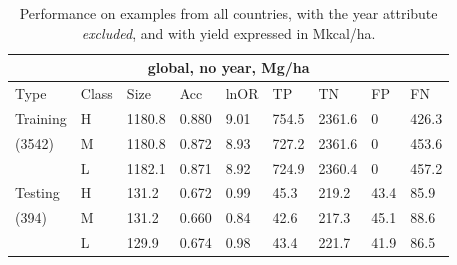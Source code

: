 \documentclass[12pt]{article}
\begin{document}
\begin{table}[h!]
\centering
\begin{tabular}{lllllllll}
\toprule
\multicolumn{9}{c}{\textbf{global, no year, Mg/ha}} \\
\midrule
Type & Class & Size & Acc & lnOR & TP & TN & FP & FN \\
\midrule
Training & H & 1180.8 & 0.880 & 9.01 & 754.5 & 2361.6 & 0 & 426.3  \\
(3542) & M & 1180.8 & 0.872 & 8.93 & 727.2 & 2361.6 & 0 & 453.6  \\
& L & 1182.1 & 0.871 & 8.92 & 724.9 & 2360.4 & 0 & 457.2  \\
Testing & H & 131.2 & 0.672 & 0.99 & 45.3 & 219.2 & 43.4 & 85.9 \\
(394) & M & 131.2 & 0.660 & 0.84 & 42.6 & 217.3 & 45.1 & 88.6 \\
& L & 129.9 & 0.674 & 0.98 & 43.4 & 221.7 & 41.9 & 86.5 \\
\bottomrule
\end{tabular}
\caption{Performance on examples from all countries, with the year attribute \emph{excluded}, and with yield expressed in Mkcal/ha.}
\label{t.ny.wt_results}
\end{table}

\end{document}
